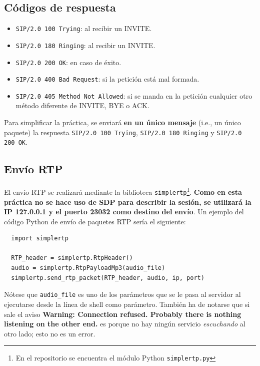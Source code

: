 \documentclass[a4paper,11pt]{article}
\begin{document}
\subsection*{Códigos de respuesta}

   \begin{itemize}
     \item \texttt{SIP/2.0 100 Trying}: al recibir un INVITE.
     \item \texttt{SIP/2.0 180 Ringing}: al recibir un INVITE.
     \item \texttt{SIP/2.0 200 OK}: en caso de éxito.
     \item \texttt{SIP/2.0 400 Bad Request}: si la petición está mal formada.
     \item \texttt{SIP/2.0 405 Method Not Allowed}: si se manda en la petición cualquier otro método diferente de INVITE, BYE o ACK.
   \end{itemize}

Para simplificar la práctica, se enviará {\bf en un único mensaje} (i.e., un único paquete) la respuesta \texttt{SIP/2.0 100 Trying}, \texttt{SIP/2.0 180 Ringing} y \texttt{SIP/2.0 200 OK}.

\subsection*{Envío RTP}

El envío RTP se realizará mediante la biblioteca \texttt{simplertp}\footnote{En el repositorio se encuentra el módulo Python \texttt{simplertp.py}}. {\bf Como en esta práctica no se hace uso de SDP para describir la sesión, se utilizará la IP 127.0.0.1 y el puerto 23032 como destino del envío}. Un ejemplo del código Python de envío de paquetes RTP sería el siguiente:

\begin{verbatim}
  import simplertp

  RTP_header = simplertp.RtpHeader()
  audio = simplertp.RtpPayloadMp3(audio_file)
  simplertp.send_rtp_packet(RTP_header, audio, ip, port)
\end{verbatim}

Nótese que \texttt{audio\_file} es uno de los parámetros que se le pasa al servidor al ejecutarse desde la línea de shell como parámetro. También ha de notarse que si sale el aviso {\bf Warning: Connection refused. Probably there is nothing listening on the other end.} es porque no hay ningún servicio \emph{escuchando} al otro lado; esto no es un error.
\end{document}
